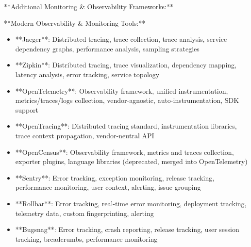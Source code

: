 \documentclass[11pt,a4paper]{article}
\begin{document}
**Additional Monitoring \& Observability Frameworks:**

**Modern Observability \& Monitoring Tools:**

\begin{itemize}
\item **Jaeger**: Distributed tracing, trace collection, trace analysis, service dependency graphs, performance analysis, sampling strategies
\end{itemize}

\begin{itemize}
\item **Zipkin**: Distributed tracing, trace visualization, dependency mapping, latency analysis, error tracking, service topology
\end{itemize}

\begin{itemize}
\item **OpenTelemetry**: Observability framework, unified instrumentation, metrics/traces/logs collection, vendor-agnostic, auto-instrumentation, SDK support
\end{itemize}

\begin{itemize}
\item **OpenTracing**: Distributed tracing standard, instrumentation libraries, trace context propagation, vendor-neutral API
\end{itemize}

\begin{itemize}
\item **OpenCensus**: Observability framework, metrics and traces collection, exporter plugins, language libraries (deprecated, merged into OpenTelemetry)
\end{itemize}

\begin{itemize}
\item **Sentry**: Error tracking, exception monitoring, release tracking, performance monitoring, user context, alerting, issue grouping
\end{itemize}

\begin{itemize}
\item **Rollbar**: Error tracking, real-time error monitoring, deployment tracking, telemetry data, custom fingerprinting, alerting
\end{itemize}

\begin{itemize}
\item **Bugsnag**: Error tracking, crash reporting, release tracking, user session tracking, breadcrumbs, performance monitoring
\end{itemize}
\end{document}
